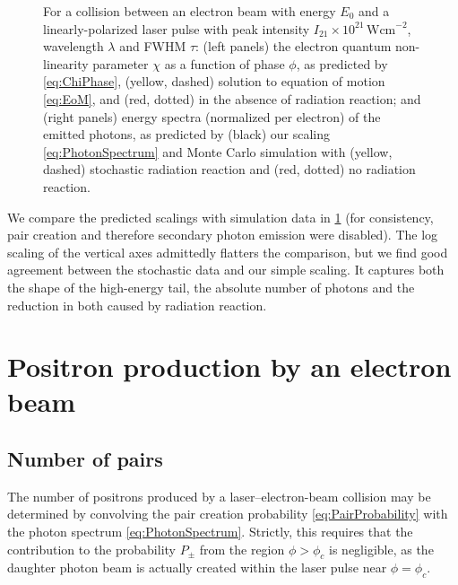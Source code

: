 \documentclass[reprint,superscriptaddress,amsmath,amssymb,aps,pra]{revtex4-1}
\newcommand{\Wcm}{\mathrm{Wcm}}
\begin{document}
	\begin{figure}
	\subfloat[]{\label{fig:spec-Bella}}
	\subfloat[]{\label{fig:spec-SLAC}}
	\subfloat[]{\label{fig:spec-ELI}}
	\caption[Photon spectra]
			{For a collision between an electron beam with
			energy $E_0$ and a linearly-polarized laser pulse with peak intensity
			$I_{21}\times10^{21}\,\Wcm^{-2}$, wavelength $\lambda$
			and FWHM $\tau$:
			(left panels) the electron quantum non-linearity
			parameter $\chi$ as a function of phase $\phi$, as predicted by
			\cref{eq:ChiPhase}, (yellow, dashed) solution to equation of motion
			\cref{eq:EoM}, and (red, dotted) in the absence of radiation reaction;
			and (right panels) energy spectra (normalized per electron) of the
			emitted photons, as predicted
			by (black) our scaling \cref{eq:PhotonSpectrum} and Monte Carlo simulation
			with (yellow, dashed) stochastic radiation reaction and (red, dotted)
			no radiation reaction.}
	\label{fig:PhotonSpectra}
	\end{figure}
	
We compare the predicted scalings with simulation data in \cref{fig:PhotonSpectra}
(for consistency, pair creation and therefore secondary photon emission were
disabled).
The log scaling of the vertical axes admittedly flatters the comparison, but
we find good agreement between the stochastic data and our simple scaling.
It captures both the shape of the high-energy tail, the absolute number of
photons and the reduction in both caused by radiation reaction.

\section{Positron production by an electron beam}
\label{sec:PairCreation}

\subsection{Number of pairs}
\label{ssec:ElectronBeam}

The number of positrons produced by a laser--electron-beam collision may
be determined by convolving the pair creation probability \cref{eq:PairProbability}
with the photon spectrum \cref{eq:PhotonSpectrum}. Strictly, this requires that
the contribution to the probability $P_\pm$ from the region $\phi > \phi_c$ is
negligible, as the daughter photon beam is actually created within
the laser pulse near $\phi = \phi_c$.
\end{document}

